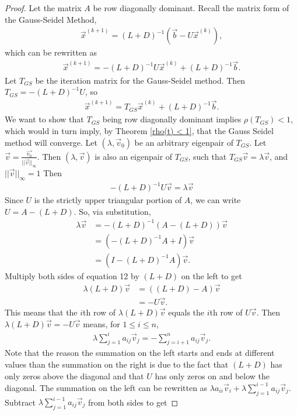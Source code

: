 \documentclass[12pt,letterpaper]{article}
\theoremstyle{definition}
\begin{document}
\begin{proof}
Let the matrix $A$ be row diagonally dominant. Recall the matrix form of the Gauss-Seidel Method,
\begin{align*}
    \vec{x}^{(k+1)} = (L+D)^{-1}(\vec{b}-U\vec{x}^{(k)}),
\end{align*}
which can be rewritten as
\begin{align*}
    \vec{x}^{(k+1)} = -(L+D)^{-1}U\vec{x}^{(k)} + (L+D)^{-1}\vec{b}.
\end{align*}
Let $T_{GS}$ be the iteration matrix for the Gauss-Seidel method. Then $T_{GS} = -(L + D)^{-1}U$, so
\begin{align*}
    \vec{x}^{(k+1)} = T_{GS}\vec{x}^{(k)} + (L+D)^{-1}\vec{b}.
\end{align*}
We want to show that $T_{GS}$ being row diagonally dominant implies $\rho(T_{GS})<1$, which would in turn imply, by Theorem \ref{rho(t) < 1}, that the Gauss Seidel method will converge. Let $(\lambda, \vec{v}_{0})$ be an arbitrary eigenpair of $T_{GS}$. Let $\vec{v} = \frac{\vec{v_{0}}}{||\vec{v}||_{\infty}}$. Then $(\lambda, \vec{v})$ is also an eigenpair of $T_{GS}$, such that $T_{GS}\vec{v} = \lambda\vec{v}$, and $||\vec{v}||_\infty = 1$ Then  
\begin{align*}
    -(L + D)^{-1}U\vec{v} = \lambda\vec{v}
\end{align*}
Since $U$ is the strictly upper triangular portion of $A$, we can write $U = A - (L+D)$. So, via substitution,
\begin{align}
    \lambda\vec{v} &= -(L + D)^{-1}(A - (L+D))\vec{v}
\\    &= (-(L + D)^{-1}A + I)\vec{v}
\\    &= (I - (L + D)^{-1}A)\vec{v}.
\end{align}
Multiply both sides of equation 12 by $(L + D)$ on the left to get
\begin{align*}
    \lambda(L+D)\vec{v} &= ((L+D) - A)\vec{v}
\\   &= -U\vec{v}.
\end{align*}
This means that the $i$th row of $\lambda(L+D)\vec{v}$ equals the $i$th row of $U\vec{v}$. Then  $\lambda(L+D)\vec{v} = -U\vec{v}$ means, for $1\leq i\leq n$,
\begin{align*}
    \lambda\sum_{j=1}^{i}a_{ij}\vec{v}_{j} = -\sum_{j=i + 1}^{n}a_{ij}\vec{v}_{j}.
\end{align*}
Note that the reason the summation on the left starts and ends at different values than the summation on the right is due to the fact that $(L+D)$ has only zeros above the diagonal and that $U$ has only zeros on and below the diagonal. The summation on the left can be rewritten as $\lambda a_{ii}\vec{v}_{i} + \lambda\sum_{j=1}^{i-1}a_{ij}\vec{v}_{j}$. Subtract $\lambda\sum_{j=1}^{i-1}a_{ij}\vec{v}_{j}$ from both sides to get

\end{proof}
\end{document}

